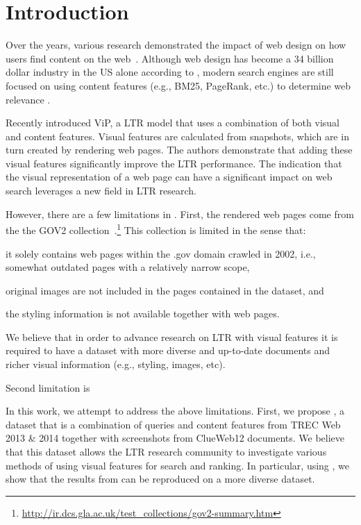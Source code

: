 
\section{Introduction}
Over the years, various research demonstrated the impact of web design on how users find content on the web~\cite{nielsen1999designing,nielsen2006f,pernice2017f,wang2014eye}.
Although web design has become a 34 billion dollar industry in the US alone according to \citet{ibisdesign}, modern search engines are still focused on using content features (e.g., BM25, PageRank, etc.) to determine web relevance . 

Recently \citet{fan2017learning} introduced ViP, a \ac{LTR} model that uses a combination of both visual and content features.
Visual features are calculated from snapshots, which are in turn created by rendering web pages.
The authors demonstrate that adding these visual features significantly improve the \ac{LTR} performance.
The indication that the visual representation of a web page can have a significant impact on web search leverages a new field in \ac{LTR} research.

However, there are a few limitations in \cite{fan2017learning}.
First, the rendered web pages come from the the GOV2 collection~.\footnote{\url{http://ir.dcs.gla.ac.uk/test_collections/gov2-summary.htm}}
This collection is limited in the sense that:
\begin{inparaenum}[(i)]
\item it solely contains web pages within the .gov domain crawled in 2002, i.e., somewhat outdated pages with a relatively narrow scope,
\item original images are not included in the pages contained in the dataset, and
\item the styling information is not available together with web pages.
\end{inparaenum}
We believe that in order to advance research on \ac{LTR} with visual features it is required to have a dataset with more diverse and up-to-date documents and richer visual information (e.g., styling, images, etc).

Second limitation is 

In this work, we attempt to address the above limitations.
First, we propose \datasetname, a dataset that 
\datasetname is a combination of queries and content features from TREC Web 2013 \& 2014 together with screenshots from ClueWeb12 documents. 
We believe that this dataset allows the \ac{LTR} research community to investigate various methods of using visual features for search and ranking.
In particular, using \datasetname, we show that the results from \citet{fan2017learning} can be reproduced on a more diverse dataset.

